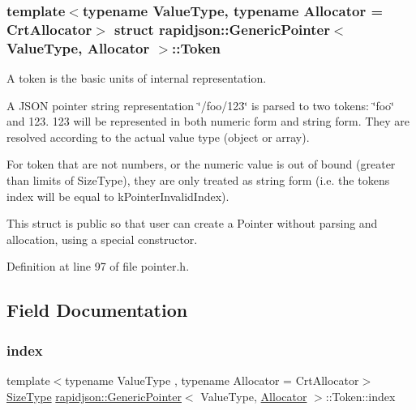 \subsubsection*{template$<$typename Value\+Type, typename Allocator = Crt\+Allocator$>$\newline
struct rapidjson\+::\+Generic\+Pointer$<$ Value\+Type, Allocator $>$\+::\+Token}

A token is the basic units of internal representation. 

A J\+S\+ON pointer string representation \char`\"{}/foo/123\char`\"{} is parsed to two tokens\+: \char`\"{}foo\char`\"{} and 123. 123 will be represented in both numeric form and string form. They are resolved according to the actual value type (object or array).

For token that are not numbers, or the numeric value is out of bound (greater than limits of Size\+Type), they are only treated as string form (i.\+e. the token\textquotesingle{}s index will be equal to k\+Pointer\+Invalid\+Index).

This struct is public so that user can create a Pointer without parsing and allocation, using a special constructor. 

Definition at line 97 of file pointer.\+h.



\subsection{Field Documentation}
\mbox{\label{structrapidjson_1_1_generic_pointer_1_1_token_a50331c9e3dedc34d2c79745b2e58fb2d}} 
\subsubsection{\texorpdfstring{index}{index}}
{\footnotesize\ttfamily template$<$typename Value\+Type , typename Allocator  = Crt\+Allocator$>$ \\
\mbox{\hyperlink{namespacerapidjson_a44eb33eaa523e36d466b1ced64b85c84}{Size\+Type}} \mbox{\hyperlink{classrapidjson_1_1_generic_pointer}{rapidjson\+::\+Generic\+Pointer}}$<$ Value\+Type, \mbox{\hyperlink{classrapidjson_1_1_allocator}{Allocator}} $>$\+::Token\+::index}



